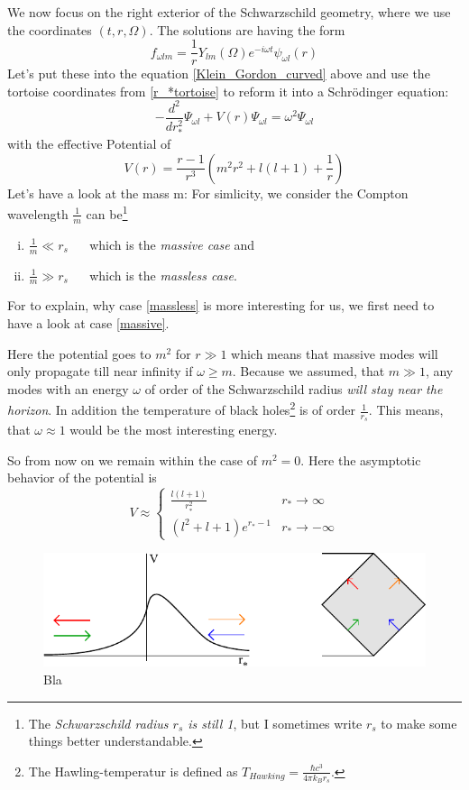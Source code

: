 	We now focus on the right exterior of the Schwarzschild geometry, where we use the coordinates $(t,r, \Omega)$. The solutions are having the form
		\begin{equation}
			f_{\omega l m} = 
			\frac{1}{r} Y_{l m}(\Omega) e^{-i \omega t} \psi_{\omega l}(r)
		\end{equation}
	Let's put these into the equation \eqref{Klein_Gordon_curved} above and use the tortoise coordinates from \eqref{r_*tortoise} to reform it into a Schrödinger equation:
		\begin{equation}
			- \frac{d^2}{dr^2_*} \Psi_{\omega l} 
			+ V(r) \Psi_{\omega l} 
			= \omega^2 \Psi_{\omega l}
		\end{equation}
	with the effective Potential of
		\begin{equation}
			V(r)=
			\frac{r-1}{r^3} \left( m^2r^2 + l(l+1) + \frac{1}{r}
			\right)
		\end{equation}
	Let's have a look at the mass m: For simlicity, we consider the Compton wavelength $\frac{1}{m}$ can be\footnote{ The \textit{Schwarzschild radius $r_s$ is still 1}, but I sometimes write $r_s$ to make some things better understandable.} 
		\begin{enumerate}[(i)]
			\item $\frac{1}{m} \ll r_s$	~~ which is the \textit{massive case} and \label{massive}
			\item $\frac{1}{m} \gg r_s$	~~ which is the \textit{massless case}. \label{massless}
		\end{enumerate}
	For to explain, why case \eqref{massless} is more interesting for us, we first need to have a look at case \eqref{massive}.
	
	 Here the potential goes to $m^2$ for $r \gg 1$ which means that massive modes will only propagate till near infinity if $\omega \geq m$. Because we assumed, that $m \gg 1$, any modes with an energy $\omega$ of order of the Schwarzschild radius \textit{will stay near the horizon}. In addition the temperature of black holes\footnote{The Hawling-temperatur is defined as $T_{Hawking}= 
	 \frac{\hbar c^3}{4 \pi k_B r_s}$.} is of order $\frac{1}{r_s}$. This means, that $\omega \approx 1$ would be the most interesting energy. 
	
	So from now on we remain within the case of $m^2=0$.
	Here the asymptotic behavior of the potential is
		\begin{equation}
			V\approx
			\begin{cases}
				\frac{l(l+1)}{r^2_*} &r_* \rightarrow \infty \\
				(l^2 + l + 1) e^{r_*-1} &r_* \rightarrow - \infty
			\end{cases}
		\end{equation}
		
	\begin{figure} [tbp]
		\begin{center}
			\includegraphics[scale=1.6]{schscat}
			\caption{Bla} \label{plots_of_V}
		\end{center}
	\end{figure}